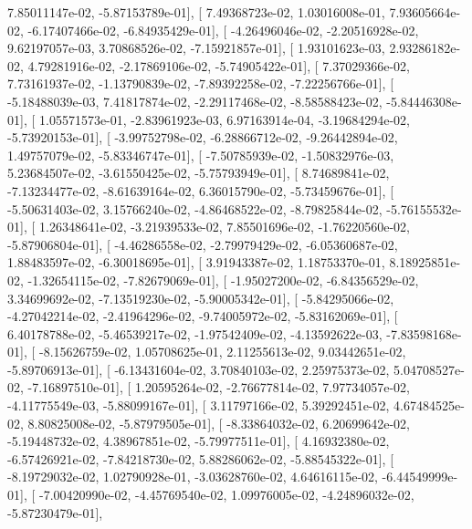 \documentclass{article}
\begin{document}
          7.85011147e-02,  -5.87153789e-01],
       [  7.49368723e-02,   1.03016008e-01,   7.93605664e-02,
         -6.17407466e-02,  -6.84935429e-01],
       [ -4.26496046e-02,  -2.20516928e-02,   9.62197057e-03,
          3.70868526e-02,  -7.15921857e-01],
       [  1.93101623e-03,   2.93286182e-02,   4.79281916e-02,
         -2.17869106e-02,  -5.74905422e-01],
       [  7.37029366e-02,   7.73161937e-02,  -1.13790839e-02,
         -7.89392258e-02,  -7.22256766e-01],
       [ -5.18488039e-03,   7.41817874e-02,  -2.29117468e-02,
         -8.58588423e-02,  -5.84446308e-01],
       [  1.05571573e-01,  -2.83961923e-03,   6.97163914e-04,
         -3.19684294e-02,  -5.73920153e-01],
       [ -3.99752798e-02,  -6.28866712e-02,  -9.26442894e-02,
          1.49757079e-02,  -5.83346747e-01],
       [ -7.50785939e-02,  -1.50832976e-03,   5.23684507e-02,
         -3.61550425e-02,  -5.75793949e-01],
       [  8.74689841e-02,  -7.13234477e-02,  -8.61639164e-02,
          6.36015790e-02,  -5.73459676e-01],
       [ -5.50631403e-02,   3.15766240e-02,  -4.86468522e-02,
         -8.79825844e-02,  -5.76155532e-01],
       [  1.26348641e-02,  -3.21939533e-02,   7.85501696e-02,
         -1.76220560e-02,  -5.87906804e-01],
       [ -4.46286558e-02,  -2.79979429e-02,  -6.05360687e-02,
          1.88483597e-02,  -6.30018695e-01],
       [  3.91943387e-02,   1.18753370e-01,   8.18925851e-02,
         -1.32654115e-02,  -7.82679069e-01],
       [ -1.95027200e-02,  -6.84356529e-02,   3.34699692e-02,
         -7.13519230e-02,  -5.90005342e-01],
       [ -5.84295066e-02,  -4.27042214e-02,  -2.41964296e-02,
         -9.74005972e-02,  -5.83162069e-01],
       [  6.40178788e-02,  -5.46539217e-02,  -1.97542409e-02,
         -4.13592622e-03,  -7.83598168e-01],
       [ -8.15626759e-02,   1.05708625e-01,   2.11255613e-02,
          9.03442651e-02,  -5.89706913e-01],
       [ -6.13431604e-02,   3.70840103e-02,   2.25975373e-02,
          5.04708527e-02,  -7.16897510e-01],
       [  1.20595264e-02,  -2.76677814e-02,   7.97734057e-02,
         -4.11775549e-03,  -5.88099167e-01],
       [  3.11797166e-02,   5.39292451e-02,   4.67484525e-02,
          8.80825008e-02,  -5.87979505e-01],
       [ -8.33864032e-02,   6.20699642e-02,  -5.19448732e-02,
          4.38967851e-02,  -5.79977511e-01],
       [  4.16932380e-02,  -6.57426921e-02,  -7.84218730e-02,
          5.88286062e-02,  -5.88545322e-01],
       [ -8.19729032e-02,   1.02790928e-01,  -3.03628760e-02,
          4.64616115e-02,  -6.44549999e-01],
       [ -7.00420990e-02,  -4.45769540e-02,   1.09976005e-02,
         -4.24896032e-02,  -5.87230479e-01],
\end{document}
